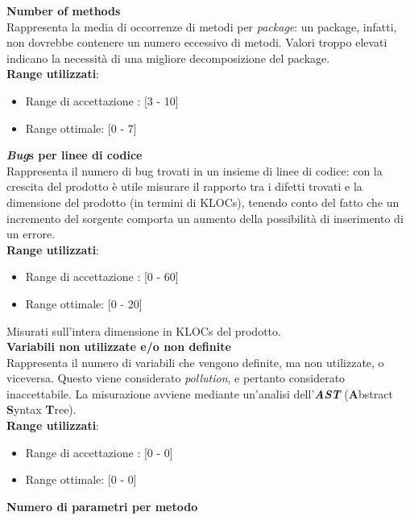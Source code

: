 \textbf{Number of methods}\\

Rappresenta la media di occorrenze di metodi per \textit{package}: un package, infatti, non dovrebbe contenere un numero eccessivo di metodi. Valori troppo elevati indicano la necessità di una migliore decomposizione del package. \\

\textbf{Range utilizzati}:
\begin{itemize}
	\item Range di accettazione : [3 - 10]
	\item Range ottimale: [0 - 7]
\end{itemize}

\textbf{\textit{Bug}s per linee di codice}\\

Rappresenta il numero di bug trovati in un insieme di linee di codice: con la crescita del prodotto è utile misurare il rapporto tra i difetti trovati e la dimensione del prodotto (in termini di KLOCs), tenendo conto del fatto che un incremento del sorgente comporta un aumento della possibilità di inserimento di un errore. \\

\textbf{Range utilizzati}:
\begin{itemize}
	\item Range di accettazione : [0 - 60]
	\item Range ottimale: [0 - 20]
\end{itemize}
Misurati sull'intera dimensione in KLOCs del prodotto.\\

\textbf{Variabili non utilizzate e/o non definite}\\

Rappresenta il numero di variabili che vengono definite, ma non utilizzate, o viceversa. Questo viene considerato \textit{pollution}, e pertanto considerato inaccettabile. La misurazione avviene mediante un'analisi dell'\textbf{\textit{AST}} (\textbf{A}bstract \textbf{S}yntax \textbf{T}ree). \\

\textbf{Range utilizzati}:
\begin{itemize}
	\item Range di accettazione : [0 - 0]
	\item Range ottimale: [0 - 0]
\end{itemize}


\textbf{Numero di parametri per metodo}\\

